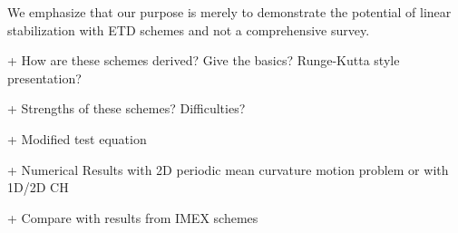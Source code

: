 We emphasize that our purpose is merely to demonstrate the potential of linear stabilization with ETD schemes and not a comprehensive survey.

+ How are these schemes derived? Give the basics? Runge-Kutta style presentation? 

+ Strengths of these schemes? Difficulties? 

+ Modified test equation

+ Numerical Results with 2D periodic mean curvature motion problem or with 1D/2D CH 

+ Compare with results from IMEX schemes
